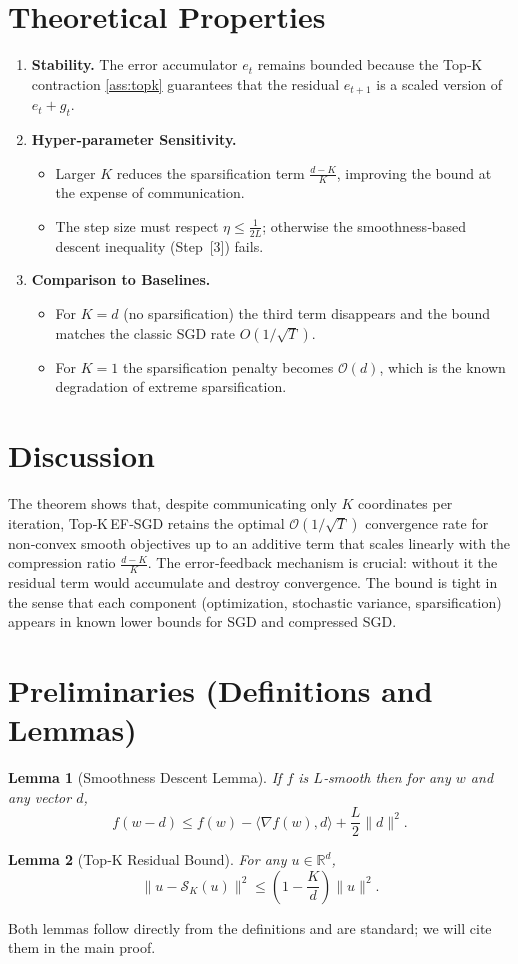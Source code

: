 \documentclass[11pt]{article}
\newtheorem{lemma}{Lemma}[section]
\begin{document}
\section*{Theoretical Properties}
\begin{enumerate}[label=\arabic*)]
\item \textbf{Stability.} The error accumulator $e_{t}$ remains bounded because the Top‑K contraction \eqref{ass:topk} guarantees that the residual $e_{t+1}$ is a scaled version of $e_{t}+g_{t}$.
\item \textbf{Hyper‑parameter Sensitivity.}
    \begin{itemize}
        \item Larger $K$ reduces the sparsification term $\frac{d-K}{K}$, improving the bound at the expense of communication.
        \item The step size must respect $\eta\le\frac{1}{2L}$; otherwise the smoothness‑based descent inequality (Step~[3]) fails.
    \end{itemize}
\item \textbf{Comparison to Baselines.}
    \begin{itemize}
        \item For $K=d$ (no sparsification) the third term disappears and the bound matches the classic SGD rate $O(1/\sqrt{T})$.
        \item For $K=1$ the sparsification penalty becomes $\mathcal{O}(d)$, which is the known degradation of extreme sparsification.
    \end{itemize}
\end{enumerate}

\section*{Discussion}
The theorem shows that, despite communicating only $K$ coordinates per iteration, Top‑K EF‑SGD retains the optimal $\mathcal{O}(1/\sqrt{T})$ convergence rate for non‑convex smooth objectives up to an additive term that scales linearly with the compression ratio $\frac{d-K}{K}$. The error‑feedback mechanism is crucial: without it the residual term would accumulate and destroy convergence. The bound is tight in the sense that each component (optimization, stochastic variance, sparsification) appears in known lower bounds for SGD and compressed SGD.

\newpage
\section*{Preliminaries (Definitions and Lemmas)}
\begin{lemma}[Smoothness Descent Lemma]\label{lem:smooth}
If $f$ is $L$‑smooth then for any $w$ and any vector $d$,
\[
f(w-d)\le f(w)-\langle\nabla f(w),d\rangle+\frac{L}{2}\|d\|^{2}.
\]
\end{lemma}
\begin{lemma}[Top‑K Residual Bound]\label{lem:topk}
For any $u\in\mathbb{R}^{d}$,
\[
\|u-\mathcal{S}_{K}(u)\|^{2}\le\left(1-\frac{K}{d}\right)\|u\|^{2}.
\]
\end{lemma}
Both lemmas follow directly from the definitions and are standard; we will cite them in the main proof.
\end{document}
